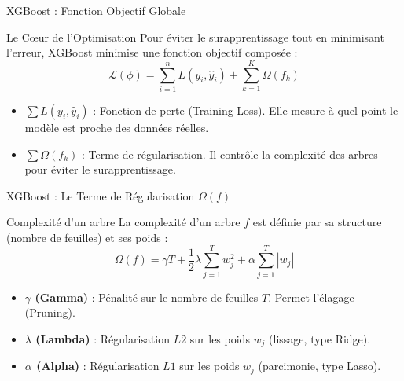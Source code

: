 
\begin{frame}{XGBoost : Fonction Objectif Globale}
    \begin{block}{Le Cœur de l'Optimisation}
        Pour éviter le surapprentissage tout en minimisant l'erreur, XGBoost minimise une fonction objectif composée :
        \[ \mathcal{L}(\phi) = \sum_{i=1}^{n} L(y_i, \hat{y}_i) + \sum_{k=1}^{K} \Omega(f_k) \]
    \end{block}

    \begin{itemize}
        \item \textbf{$\sum L(y_i, \hat{y}_i)$} : Fonction de perte (Training Loss). Elle mesure à quel point le modèle est proche des données réelles.
        \item \textbf{$\sum \Omega(f_k)$} : Terme de régularisation. Il contrôle la complexité des arbres pour éviter le surapprentissage.
    \end{itemize}
\end{frame}

\begin{frame}{XGBoost : Le Terme de Régularisation $\Omega(f)$}
    \begin{block}{Complexité d'un arbre}
        La complexité d'un arbre $f$ est définie par sa structure (nombre de feuilles) et ses poids :
        \[ \Omega(f) = \gamma T + \frac{1}{2}\lambda \sum_{j=1}^{T} w_j^2 + \alpha \sum_{j=1}^{T} |w_j| \]
    \end{block}

    \begin{itemize}
        \item \textbf{$\gamma$ (Gamma)} : Pénalité sur le nombre de feuilles $T$. Permet l'élagage (Pruning).
        \item \textbf{$\lambda$ (Lambda)} : Régularisation $L2$ sur les poids $w_j$ (lissage, type Ridge).
        \item \textbf{$\alpha$ (Alpha)} : Régularisation $L1$ sur les poids $w_j$ (parcimonie, type Lasso).
    \end{itemize}
\end{frame}


